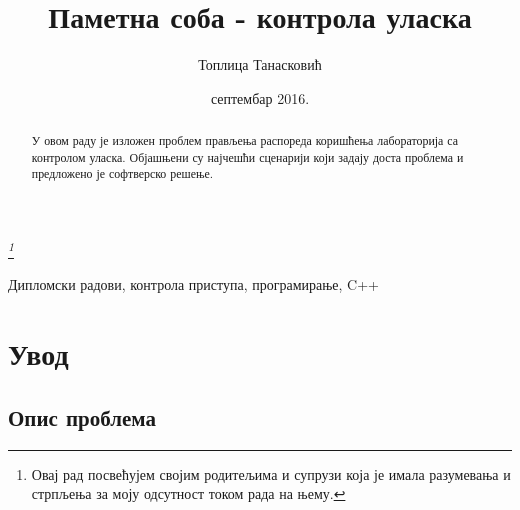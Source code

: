 \documentclass[a4paper, 12pt, diplomski]{etfcyr}
\title{Паметна соба - контрола уласка}
\author{Топлица Танасковић}
\date{септембар 2016.}
\begin{document}
	\sloppy
	\maketitle

	\thispagestyle{empty}
	\vspace*{\fill}
	\begin{center}
			\textit{\thanks{Овај рад посвећујем својим родитељима и супрузи која је имала разумевања и стрпљења за моју одсутност током рада на њему.}}
	\end{center}
	\vspace*{\fill}

	\begin{abstract}
		\begin{justify}
			У овом раду је изложен проблем прављења распореда коришћења лабораторија са контролом уласка. Објашњени су најчешћи сценарији који задају доста проблема и предложено је софтверско решење.
		\end{justify}
	\end{abstract}

	\begin{keywords}
		Дипломски радови, контрола приступа, програмирање, C++
	\end{keywords}
	\tableofcontents
	\listoffigures
	\listoftables

	\chapter{Увод}

		\section{Опис проблема}
\end{document}
